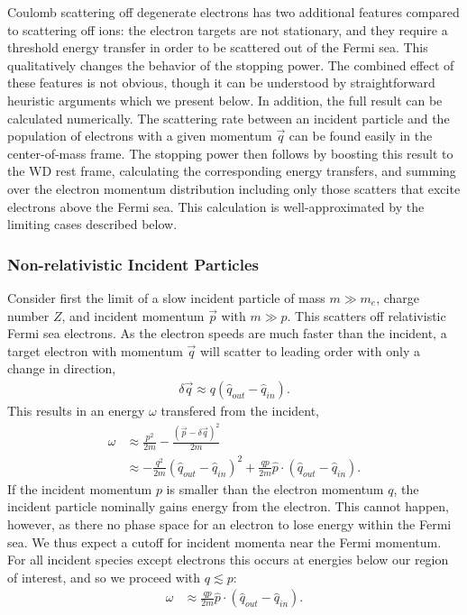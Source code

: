 Coulomb scattering off degenerate electrons has two additional features compared to scattering off ions: the electron targets are not stationary, and they require a threshold energy transfer in order to be scattered out of the Fermi sea.
This qualitatively changes the behavior of the stopping power.
The combined effect of these features is not obvious, though it can be understood by straightforward heuristic arguments which we present below.
In addition, the full result can be calculated numerically.
The scattering rate between an incident particle and the population of electrons with a given momentum $\vec{q}$ can be found easily in the center-of-mass frame.
The stopping power then follows by boosting this result to the WD rest frame, calculating the corresponding energy transfers, and summing over the electron momentum distribution including only those scatters that excite electrons above the Fermi sea.
This calculation is well-approximated by the limiting cases described below.

\subsubsection{Non-relativistic Incident Particles}
Consider first the limit of a slow incident particle of mass $m \gg m_e$, charge number $Z$, and incident momentum $\vec{p}$ with $m \gg p$.
This scatters off relativistic Fermi sea electrons.
As the electron speeds are much faster than the incident, a target electron with momentum $\vec{q}$ will scatter to leading order with only a change in direction,
\begin{align}
  \delta \vec{q} \approx q \left(\hat{q}_{out} - \hat{q}_{in}\right).
\end{align}
This results in an energy $\omega$ transfered from the incident,
\begin{align}
  \omega &\approx \frac{p^2}{2 m} -
    \frac{\left(\vec{p} - \delta \vec{q}\right)^2}{2 m} \\
    &\approx -\frac{q^2}{2m}  \left(\hat{q}_{out} - \hat{q}_{in}\right)^2
  + \frac{q p}{2m} \hat{p} \cdot \left(\hat{q}_{out} - \hat{q}_{in}\right).
\end{align}
If the incident momentum $p$ is smaller than the electron momentum $q$, the incident particle nominally gains energy from the electron.
This cannot happen, however, as there no phase space for an electron to lose energy within the Fermi sea.
We thus expect a cutoff for incident momenta near the Fermi momentum.
For all incident species except electrons this occurs at energies below our region of interest, and so we proceed with $q \lesssim p$:
\begin{align}
  \omega &\approx \frac{q p}{2m}
  \hat{p} \cdot \left(\hat{q}_{out} - \hat{q}_{in}\right).
\end{align}

